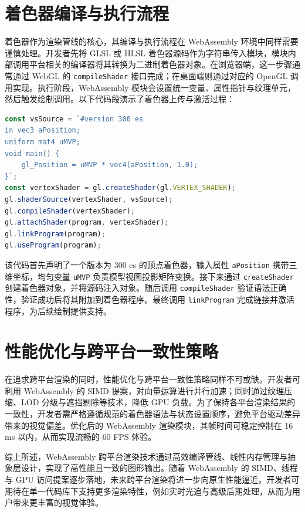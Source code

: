 \chapter{着色器编译与执行流程}
着色器作为渲染管线的核心，其编译与执行流程在 WebAssembly 环境中同样需要谨慎处理。开发者先将 GLSL 或 HLSL 着色器源码作为字符串传入模块，模块内部调用平台相关的编译器将其转换为二进制着色器对象。在浏览器端，这一步骤通常通过 WebGL 的 \texttt{compileShader} 接口完成；在桌面端则通过对应的 OpenGL 调用实现。执行阶段，WebAssembly 模块会设置统一变量、属性指针与纹理单元，然后触发绘制调用。以下代码段演示了着色器上传与激活过程：\par
\begin{lstlisting}[language=javascript]
const vsSource = `#version 300 es
in vec3 aPosition;
uniform mat4 uMVP;
void main() {
    gl_Position = uMVP * vec4(aPosition, 1.0);
}`;
const vertexShader = gl.createShader(gl.VERTEX_SHADER);
gl.shaderSource(vertexShader, vsSource);
gl.compileShader(vertexShader);
gl.attachShader(program, vertexShader);
gl.linkProgram(program);
gl.useProgram(program);
\end{lstlisting}
该代码首先声明了一个版本为 300 es 的顶点着色器，输入属性 \texttt{aPosition} 携带三维坐标，均匀变量 \texttt{uMVP} 负责模型视图投影矩阵变换。接下来通过 \texttt{createShader} 创建着色器对象，并将源码注入对象。随后调用 \texttt{compileShader} 验证语法正确性，验证成功后将其附加到着色器程序。最终调用 \texttt{linkProgram} 完成链接并激活程序，为后续绘制提供支持。\par
\chapter{性能优化与跨平台一致性策略}
在追求跨平台渲染的同时，性能优化与跨平台一致性策略同样不可或缺。开发者可利用 WebAssembly 的 SIMD 提案，对向量运算进行并行加速；同时通过纹理压缩、LOD 分级与遮挡剔除等技术，降低 GPU 负载。为了保持各平台渲染结果的一致性，开发者需严格遵循规范的着色器语法与状态设置顺序，避免平台驱动差异带来的视觉偏差。优化后的 WebAssembly 渲染模块，其帧时间可稳定控制在 16 ms 以内，从而实现流畅的 60 FPS 体验。\par
综上所述，WebAssembly 跨平台渲染技术通过高效编译管线、线性内存管理与抽象层设计，实现了高性能且一致的图形输出。随着 WebAssembly 的 SIMD、线程与 GPU 访问提案逐步落地，未来跨平台渲染将进一步向原生性能逼近。开发者可期待在单一代码库下支持更多渲染特性，例如实时光追与高级后期处理，从而为用户带来更丰富的视觉体验。\par

